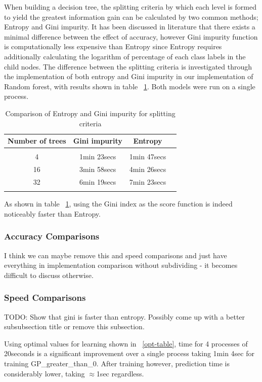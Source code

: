 \documentclass{article} %
\begin{document}
When building a decision tree, the splitting criteria by which each level is formed to yield the greatest information gain can be calculated by two common methods; Entropy and Gini impurity. It has been discussed in literature that there exists a minimal difference between the effect of accuracy, however Gini
impurity function is computationally less expensive than Entropy since Entropy requires additionally calculating the logarithm of percentage of each class labels in the child nodes. The difference between the splitting criteria is investigated through the implementation of both entropy and Gini impurity in our implementation of Random forest, with results shown in table ~\ref{ent-gini}. Both models were run on a single process.

\begin{table}[h]
\caption{Comparison of Entropy and Gini impurity for splitting criteria}
\begin{center}
\begin{tabular}{cccc}
{\bf Number of trees} &{\bf Gini impurity} &{\bf Entropy}
\\ \hline \\
4	&1min 23secs    &1min 47secs\\
16	&3min 58secs    &4min 26secs\\
32	&6min 19secs    &7min 23secs\\
\label{ent-gini}
\end{tabular}
\end{center}
\end{table}

As shown in table ~\ref{ent-gini}, using the Gini index as the score function is indeed noticeably faster than Entropy.


\subsubsection{Accuracy Comparisons}

I think we can maybe remove this and speed comparisons and just have everything in implementation comparison without subdividing - it becomes difficult to discuss otherwise.

\subsubsection{Speed Comparisons}
TODO: Show that gini is faster than entropy.  Possibly come up with a better subsubsection title or remove this subsection.

Using optimal values for learning shown in ~\ref{opt-table}, time for 4 processes of 20seconds is a significant improvement over a single process taking 1min 4sec for training GP\_greater\_than\_0. After training however, prediction time is considerably lower, taking $\approx$1sec regardless.
\end{document}
